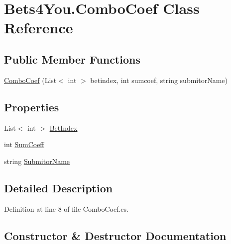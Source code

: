 \hypertarget{class_bets4_you_1_1_combo_coef}{}\section{Bets4\+You.\+Combo\+Coef Class Reference}
\label{class_bets4_you_1_1_combo_coef}
\subsection*{Public Member Functions}
\begin{DoxyCompactItemize}
\item 
\mbox{\hyperlink{class_bets4_you_1_1_combo_coef_a5ce5aeae9cb9c6891dd4cb82e941d90a}{Combo\+Coef}} (List$<$ int $>$ betindex, int sumcoef, string submitor\+Name)
\end{DoxyCompactItemize}
\subsection*{Properties}
\begin{DoxyCompactItemize}
\item 
List$<$ int $>$ \mbox{\hyperlink{class_bets4_you_1_1_combo_coef_aa840bb69e3818918b633146835874daf}{Bet\+Index}}
\item 
int \mbox{\hyperlink{class_bets4_you_1_1_combo_coef_a50cb46468caccfcf79d66121f65b38e9}{Sum\+Coeff}}
\item 
string \mbox{\hyperlink{class_bets4_you_1_1_combo_coef_a59711f6d39ff866333be88dd0ae45efa}{Submitor\+Name}}
\end{DoxyCompactItemize}


\subsection{Detailed Description}


Definition at line 8 of file Combo\+Coef.\+cs.



\subsection{Constructor \& Destructor Documentation}
\mbox{\label{class_bets4_you_1_1_combo_coef_a5ce5aeae9cb9c6891dd4cb82e941d90a}} 
